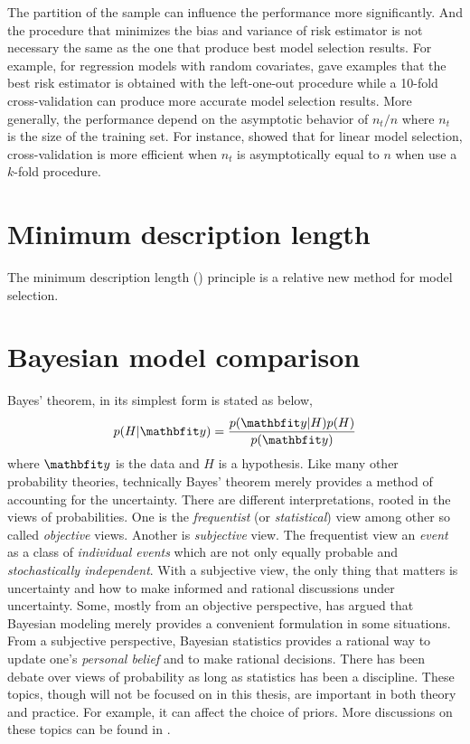The partition of the sample can influence the performance more significantly.
And the procedure that minimizes the bias and variance of risk estimator is
not necessary the same as the one that produce best model selection results.
For example, for regression models with random covariates,
\cite{Breiman:1992vx} gave examples that the best risk estimator is obtained
with the left-one-out procedure while a 10-fold cross-validation can produce
more accurate model selection results. More generally, the performance
depend on the asymptotic behavior of $n_t/n$ where $n_t$ is the size of the
training set. For instance, \cite{Shao:1997vx} showed that for linear model
selection, cross-validation is more efficient when $n_t$ is asymptotically
equal to $n$ when use a $k$-fold procedure.

\section{Minimum description length}
\label{sec:Minimum description length}

The minimum description length (\mdl) principle is a relative new method for
model selection.

\section{Bayesian model comparison}
\label{sec:Bayesian model comparison}

Bayes' theorem, in its simplest form is stated as below,
\begin{equation}
  p(H|\data) = \frac{p(\data|H)p(H)}{p(\data)} \label{eq:bayes}
\end{equation}
where $\data$ is the data and $H$ is a hypothesis. Like many other probability
theories, technically Bayes' theorem merely provides a method of accounting
for the uncertainty. There are different interpretations, rooted in the views
of probabilities. One is the \emph{frequentist} (or \emph{statistical}) view
among other so called \emph{objective} views. Another is \emph{subjective}
view. The frequentist view an \emph{event} as a class of \emph{individual
  events} which are not only equally probable and \emph{stochastically
  independent}. With a subjective view, the only thing that matters is
uncertainty and how to make informed and rational discussions under
uncertainty. Some, mostly from an objective perspective, has argued that
Bayesian modeling merely provides a convenient formulation in some situations.
From a subjective perspective, Bayesian statistics provides a rational way to
update one's \emph{personal belief} and to make rational decisions. There has
been debate over views of probability as long as statistics has been a
discipline. These topics, though will not be focused on in this thesis, are
important in both theory and practice. For example, it can affect the choice
of priors. More discussions on these topics can be found in
\cite[][chap.~1]{Bernardo:1994vd}.

